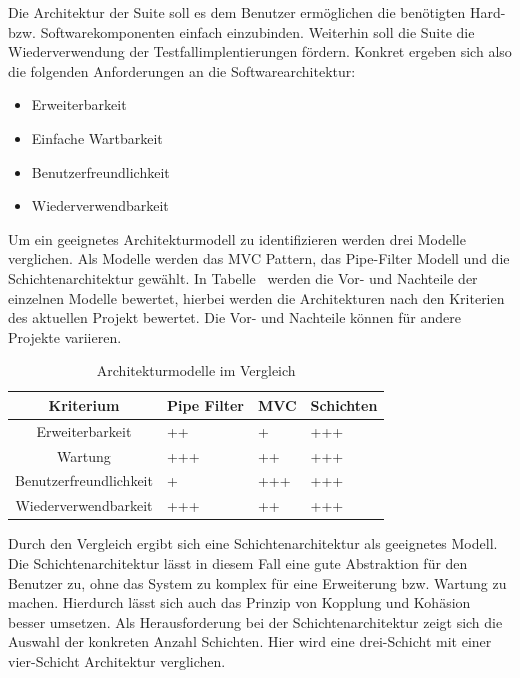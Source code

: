 \newline
Die Architektur der Suite soll es dem Benutzer ermöglichen die benötigten Hard- bzw. Softwarekomponenten einfach einzubinden. Weiterhin soll die Suite die Wiederverwendung der Testfallimplentierungen fördern.
Konkret ergeben sich also die folgenden Anforderungen an die Softwarearchitektur:
\begin{itemize}
	\item Erweiterbarkeit
	\item Einfache Wartbarkeit
	\item Benutzerfreundlichkeit
	\item Wiederverwendbarkeit
\end{itemize}
Um ein geeignetes Architekturmodell zu identifizieren werden drei Modelle verglichen. Als Modelle werden das MVC Pattern, das Pipe-Filter Modell und die Schichtenarchitektur gewählt. In Tabelle \dq {}\dq~werden die Vor- und Nachteile der einzelnen Modelle bewertet, hierbei werden die Architekturen nach den Kriterien des aktuellen Projekt bewertet. Die Vor- und Nachteile können für andere Projekte variieren.
\newpage
\begin{table}[h]
\begin{center}
\begin{tabularx}{\textwidth}{|c|X|X|X|}
\hline
Kriterium & Pipe Filter & MVC & Schichten \\
\hline
Erweiterbarkeit & ++ & + & +++ \\
\hline
Wartung & +++ & ++ & +++ \\
\hline
Benutzerfreundlichkeit & + & +++ & +++ \\
\hline
Wiederverwendbarkeit & +++ & ++ & +++ \\
\hline


\end{tabularx}
\end{center}
\caption{Architekturmodelle im Vergleich  \label{tab:vergleich}}
\end{table}
Durch den Vergleich ergibt sich eine Schichtenarchitektur als geeignetes Modell. Die Schichtenarchitektur lässt in diesem Fall eine gute Abstraktion für den Benutzer zu, ohne das System zu komplex für eine Erweiterung bzw. Wartung zu machen. Hierdurch lässt sich auch das Prinzip von Kopplung und Kohäsion besser umsetzen. Als Herausforderung bei der Schichtenarchitektur zeigt sich die Auswahl der konkreten Anzahl Schichten. Hier wird eine drei-Schicht mit einer vier-Schicht Architektur verglichen. 
